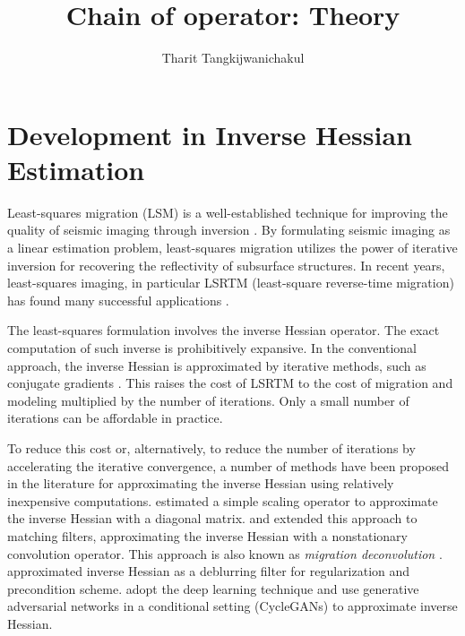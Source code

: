 \title{Chain of operator: Theory}
\author{Tharit Tangkijwanichakul}
\label{ch:chapter-background}

\maketitle
{}

\newcommand\inv[1]{#1\raisebox{1.15ex}{$\scriptscriptstyle-\!1$}} %

\section{Development in Inverse Hessian Estimation}

Least-squares migration (LSM) is a well-established technique for improving the quality of seismic imaging through inversion \cite[]{nemeth,ronen}. By formulating seismic imaging as a linear estimation problem, least-squares migration utilizes the power of iterative inversion for recovering the reflectivity of subsurface structures. In recent years, least-squares imaging, in particular LSRTM (least-square reverse-time migration) has found many successful applications \cite[]{dai,wang,wong}.

The least-squares formulation involves the inverse Hessian operator. The exact computation of such inverse is prohibitively expansive. In the conventional approach, the inverse Hessian is approximated by iterative methods, such as conjugate gradients \cite[]{tarantola,sun,xue}. This raises the cost of LSRTM to the cost of migration and modeling multiplied by the number of iterations. Only a small number of iterations can be affordable in practice. 

To reduce this cost or, alternatively, to reduce the number of iterations by accelerating the iterative convergence, a number of methods have been proposed in the literature for approximating the inverse Hessian using relatively inexpensive computations. \cite{rickett} estimated a simple scaling operator to approximate the inverse Hessian with a diagonal matrix. \cite{guitton} and \cite{greer} extended this approach to matching filters, approximating the inverse Hessian with a nonstationary convolution operator. This approach is also known as \emph{migration deconvolution} \cite[]{hu2001,yu2006}. \cite{aoki} approximated inverse Hessian as a deblurring filter for regularization and precondition scheme. \cite{kaur} adopt the deep learning technique and use generative adversarial networks in a conditional setting (CycleGANs) to approximate inverse Hessian.

